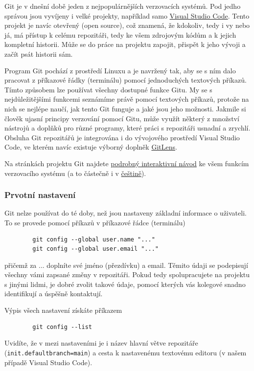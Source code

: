 \documentclass[a4paper,11pt,twoside]{article}
\def\code#1{\textnormal{\texttt{#1}}}
\theoremstyle{red}
\theoremstyle{green}
\begin{document}
    Git je v dnešní době jeden z nejpopulárnějších verzovacích systémů.
    Pod jedho správou jsou vyvíjeny i velké projekty, například samo \href{https://github.com/microsoft/vscode}{Visual Studio Code}.
    Tento projekt je navíc otevřený (open source), což znamená, že kdokoliv, tedy i vy nebo já, má přístup k celému repozitáři, tedy ke všem zdrojovým kódům a k jejich kompletní historii. 
    Může se do práce na projektu zapojit, přispět k jeho vývoji a začít psát historii sám.
    
    Program Git pochází z prostředí Linuxu a je navržený tak, aby se s ním dalo pracovat z příkazové řádky (terminálu) pomocí jednoduchých textových příkazů.
    Tímto způsobem lze používat všechny dostupné funkce Gitu.
    My se s nejdůležitějšími funkcemi seznámíme právě pomocí textových příkazů, protože na nich se nejlépe naučí, jak tento Git funguje a jaké jsou jeho možnosti.
    Jakmile si člověk ujasní principy verzování pomocí Gitu, může využít některý z množství nástrojů a doplňků pro různé programy, které práci s repozitáři usnadní a zrychlí.
    Obsluha Git repozitářů je integrována i do vývojového prostředí Visual Studio Code, ve kterém navíc existuje výborný doplněk \href{https://marketplace.visualstudio.com/items?itemName=eamodio.gitlens}{GitLens}.

    Na stránkách projektu Git najdete \href{https://git-scm.com/book/en/v2}{podrobný interaktivní návod} ke všem funkcím verzovacího systému (a to částečně i v \href{https://git-scm.com/book/cs/v2}{češtině}).

\subsubsection{Prvotní nastavení}
    Git nelze používat do té doby, než jsou nastaveny základní informace o uživateli.
    To se provede pomocí příkazů v příkazové řádce (terminálu)
    \begin{lstlisting}
        git config --global user.name "..."
        git config --global user.email "..."\end{lstlisting}
    přičemž za ... doplníte své jméno (přezdívku) a email.
    Těmito údaji se podepisují všechny vámi zapsané změny v repozitáři.
    Pokud tedy spolupracujete na projektu s jinými lidmi, je dobré zvolit takové údaje, pomocí kterých vás kolegové snadno identifikují a úspěšně kontaktují.

    Výpis všech nastavení získáte příkazem
    \begin{lstlisting}
        git config --list\end{lstlisting}
    Uvidíte, že v mezi nastaveními je i název hlavní větve repozitáře (\code{init.defaultbranch=main}) a cesta k nastavenému textovému editoru (v našem případě Visual Studio Code).
\end{document}
